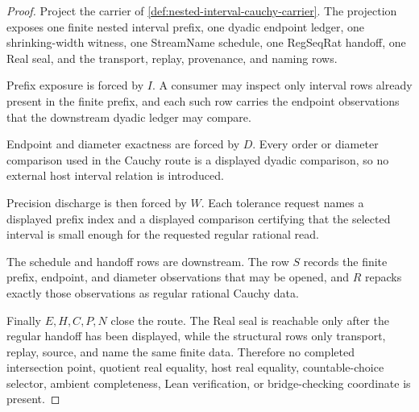 \begin{proof}
Project the carrier of \autoref{def:nested-interval-cauchy-carrier}. The projection exposes one finite nested interval prefix, one dyadic endpoint ledger, one shrinking-width witness, one StreamName schedule, one RegSeqRat handoff, one Real seal, and the transport, replay, provenance, and naming rows.

Prefix exposure is forced by $I$. A consumer may inspect only interval rows already present in the finite prefix, and each such row carries the endpoint observations that the downstream dyadic ledger may compare.

Endpoint and diameter exactness are forced by $D$. Every order or diameter comparison used in the Cauchy route is a displayed dyadic comparison, so no external host interval relation is introduced.

Precision discharge is then forced by $W$. Each tolerance request names a displayed prefix index and a displayed comparison certifying that the selected interval is small enough for the requested regular rational read.

The schedule and handoff rows are downstream. The row $S$ records the finite prefix, endpoint, and diameter observations that may be opened, and $R$ repacks exactly those observations as regular rational Cauchy data.

Finally $E,H,C,P,N$ close the route. The Real seal is reachable only after the regular handoff has been displayed, while the structural rows only transport, replay, source, and name the same finite data. Therefore no completed intersection point, quotient real equality, host real equality, countable-choice selector, ambient completeness, Lean verification, or bridge-checking coordinate is present.
\end{proof}

